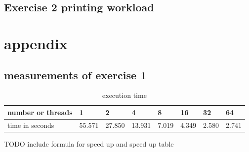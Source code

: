\documentclass[11pt,a4paper]{article}
\begin{document}
\subsection{Exercise 2 printing workload}
\label{ex22}

\pagebreak

\section{appendix}

\subsection{measurements of exercise 1}
\begin{table}[h]
\centering

\label{measuresEx1}
\begin{tabular}{@{}l||l|l|l|l|l|l|l|@{}}
number or threads & 1      & 2      & 4      & 8     & 16    & 32    & 64    \\
\hline	
time in seconds   & 55.571 & 27.850 & 13.931 & 7.019 & 4.349 & 2.580 & 2.741
\end{tabular}
\caption{execution time}
\end{table}

TODO include formula for speed up and speed up table

\listoffigures

\listoftables






\end{document}
